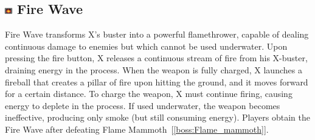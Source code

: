 \subsection{\includegraphics[width=12px, height=10px]{figures/X1/weapons/F_wave.jpg} Fire Wave}\label{Fire_wave}
Fire Wave transforms X's buster into a powerful flamethrower, capable of dealing continuous damage to enemies but which cannot be used underwater. Upon pressing the fire button, X releases a continuous stream of fire from his X-buster, draining energy in the process. When the weapon is fully charged, X launches a fireball that creates a pillar of fire upon hitting the ground, and it moves forward for a certain distance. To charge the weapon, X must continue firing, causing energy to deplete in the process. If used underwater, the weapon becomes ineffective, producing only smoke (but still consuming energy). Players obtain the Fire Wave after defeating Flame Mammoth~[\ref{boss:Flame_mammoth}].

